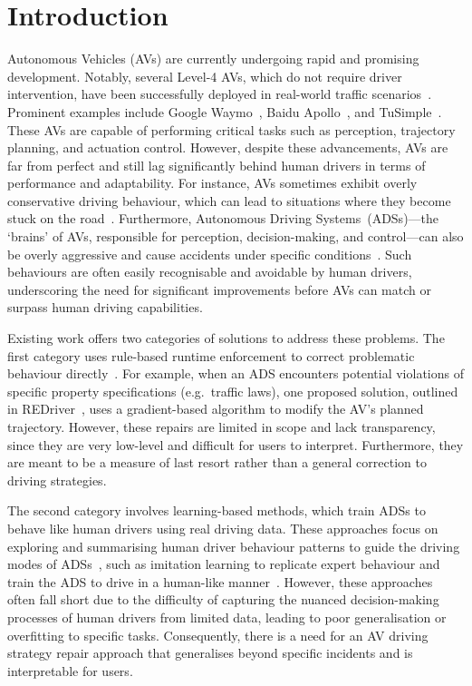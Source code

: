\section{Introduction}
Autonomous Vehicles (AVs) are currently undergoing rapid and promising development. Notably, several Level-4 AVs, which do not require driver intervention, have been successfully deployed in real-world traffic scenarios~\cite{sae2018taxonomy}. Prominent examples include Google Waymo~\cite{waymo}, Baidu Apollo~\cite{apolloauto}, and TuSimple~\cite{TuSimple}. These AVs are capable of performing critical tasks such as perception, trajectory planning, and actuation control. However, despite these advancements, AVs are far from perfect and still lag significantly behind human drivers in terms of performance and adaptability. 
For instance, AVs sometimes exhibit overly conservative driving behaviour, which can lead to situations where they become stuck on the road~\cite{wan2022too}. 
Furthermore, Autonomous Driving Systems~(ADSs)---the `brains' of AVs, responsible for perception, decision-making, and control---can also be overly aggressive and cause accidents under specific conditions~\cite{Bashetty20DeepCrashTest, li2020av, Sun-Poskitt-et_al22a, Zhou-et_al23a}.  Such behaviours are often easily recognisable and avoidable by human drivers, underscoring the need for significant improvements before AVs can match or surpass human driving capabilities.



Existing work offers two categories of solutions to address these problems. The first category uses rule-based runtime enforcement to correct problematic behaviour directly~\cite{sun2024redriver, Grieser-et_al20a, hong2020avguardian, Cheng-et_al21a, Shankar-et_al20a, Mauritz-et_al16a, d2005lola, Watanabe-et_al18a}. For example, when an ADS encounters potential violations of specific property specifications (e.g.~traffic laws), one proposed solution, outlined in REDriver~\cite{sun2024redriver}, uses a gradient-based algorithm to modify the AV's planned trajectory. 
However, these repairs are limited in scope and lack transparency, since they are very low-level and difficult for users to interpret.
Furthermore, they are meant to be a measure of last resort rather than a general correction to driving strategies.



The second category involves learning-based methods, which train ADSs to behave like human drivers using real driving data. These approaches focus on exploring and summarising human driver behaviour patterns to guide the driving modes of ADSs~\cite{chen2023end, prakash2021multi}, such as imitation learning to replicate expert behaviour and train the ADS to drive in a human-like manner~\cite{sama2020extracting, wei2010learning, xu2015establishing, xu2020learning, le2022survey}. However, these approaches often fall short due to the difficulty of capturing the nuanced decision-making processes of human drivers from limited data, leading to poor generalisation or overfitting to specific tasks. Consequently, there is a need for an AV driving strategy repair approach that generalises beyond specific incidents and is interpretable for users.



